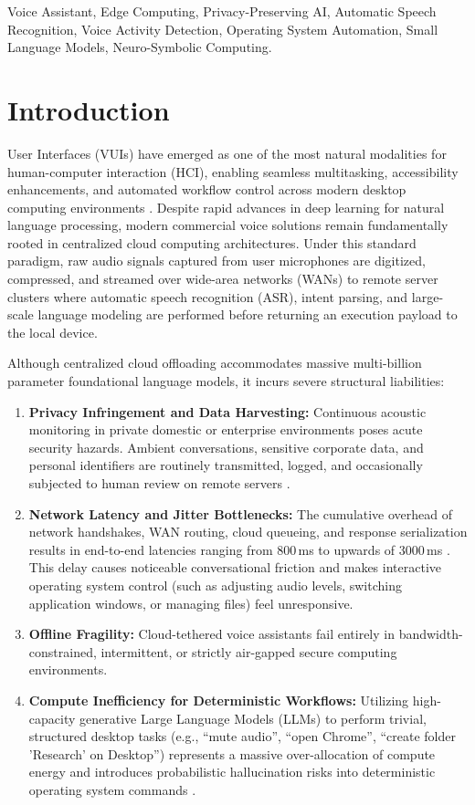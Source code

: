 \documentclass[conference]{IEEEtran}
\begin{document}
\begin{IEEEkeywords}
Voice Assistant, Edge Computing, Privacy-Preserving AI, Automatic Speech Recognition, Voice Activity Detection, Operating System Automation, Small Language Models, Neuro-Symbolic Computing.
\end{IEEEkeywords}

\section{Introduction}
 User Interfaces (VUIs) have emerged as one of the most natural modalities for human-computer interaction (HCI), enabling seamless multitasking, accessibility enhancements, and automated workflow control across modern desktop computing environments \cite{alrubaie2021privacy}. Despite rapid advances in deep learning for natural language processing, modern commercial voice solutions remain fundamentally rooted in centralized cloud computing architectures. Under this standard paradigm, raw audio signals captured from user microphones are digitized, compressed, and streamed over wide-area networks (WANs) to remote server clusters where automatic speech recognition (ASR), intent parsing, and large-scale language modeling are performed before returning an execution payload to the local device.

Although centralized cloud offloading accommodates massive multi-billion parameter foundational language models, it incurs severe structural liabilities:
\begin{enumerate}
    \item \textbf{Privacy Infringement and Data Harvesting:} Continuous acoustic monitoring in private domestic or enterprise environments poses acute security hazards. Ambient conversations, sensitive corporate data, and personal identifiers are routinely transmitted, logged, and occasionally subjected to human review on remote servers \cite{krueger2022eavesdropping, alrubaie2021privacy}.
    \item \textbf{Network Latency and Jitter Bottlenecks:} The cumulative overhead of network handshakes, WAN routing, cloud queueing, and response serialization results in end-to-end latencies ranging from 800\,ms to upwards of 3000\,ms \cite{garg2022edgespeech}. This delay causes noticeable conversational friction and makes interactive operating system control (such as adjusting audio levels, switching application windows, or managing files) feel unresponsive.
    \item \textbf{Offline Fragility:} Cloud-tethered voice assistants fail entirely in bandwidth-constrained, intermittent, or strictly air-gapped secure computing environments.
    \item \textbf{Compute Inefficiency for Deterministic Workflows:} Utilizing high-capacity generative Large Language Models (LLMs) to perform trivial, structured desktop tasks (e.g., ``mute audio'', ``open Chrome'', ``create folder 'Research' on Desktop'') represents a massive over-allocation of compute energy and introduces probabilistic hallucination risks into deterministic operating system commands \cite{schick2023toolformer}.
\end{enumerate}
\end{document}
